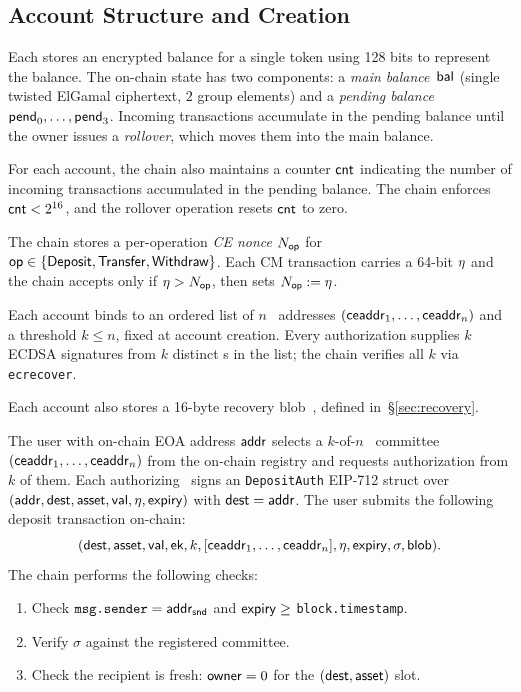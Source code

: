 \subsection{Account Structure and Creation}
\label{sec:account}

Each \CMAccount stores an encrypted balance for a single token using 128 bits to represent the balance.
The on-chain state has two components: a \emph{main balance}~$\mathsf{bal}$ (single twisted ElGamal ciphertext, $2$ group elements) and a \emph{pending balance}~$\mathsf{pend}_0, \ldots, \mathsf{pend}_3$.
Incoming transactions accumulate in the pending balance until the owner issues a \emph{rollover}, which moves them into the main balance.

For each account, the chain also maintains a counter $\mathsf{cnt}$ indicating the number of incoming transactions accumulated in the pending balance.
The chain enforces $\mathsf{cnt} < 2^{16}$, and the rollover operation resets $\mathsf{cnt}$ to zero.

The chain stores a per-operation \emph{CE nonce} $N_{\sf op}$ for ${\sf op} \in \{\mathsf{Deposit}, \mathsf{Transfer}, \mathsf{Withdraw}\}$.
Each CM transaction carries a 64-bit $\eta$ and the chain accepts only if $\eta > N_{\sf op}$, then sets $N_{\sf op} := \eta$.

Each account binds to an ordered list of $n$ \CE\ addresses $(\mathsf{ceaddr}_1, \ldots, \mathsf{ceaddr}_n)$ and a threshold $k \le n$, fixed at account creation.
Every authorization supplies $k$ ECDSA signatures from $k$ distinct \CE s in the list; the chain verifies all $k$ via \texttt{ecrecover}.

Each account also stores a 16-byte recovery blob~\blob, defined in~\S\ref{sec:recovery}.



The user with on-chain EOA address ${\mathsf{addr}}$ selects a $k$-of-$n$ \CE\ committee $(\mathsf{ceaddr}_1, \ldots, \mathsf{ceaddr}_n)$ from the on-chain registry and requests authorization from $k$ of them.
Each authorizing \CE\ signs an \texttt{DepositAuth} EIP-712 struct over $({\mathsf{addr}}, \mathsf{dest}, \mathsf{asset}, \mathsf{val}, \eta, \mathsf{expiry})$ with $\mathsf{dest} = {\mathsf{addr}}$.
The user submits the following deposit transaction on-chain:
%
\[
  (\mathsf{dest}, \mathsf{asset}, \mathsf{val}, \textsf{ek}, k, [\mathsf{ceaddr}_1, \ldots, \mathsf{ceaddr}_n], \eta, \mathsf{expiry}, \sigma, \mathsf{blob}).
\]
The chain performs the following checks:
%
\begin{enumerate}[nosep]
    \item Check $\texttt{msg.sender} = {\mathsf{addr}}_{\sf snd}$ and $\mathsf{expiry} \ge $ \texttt{block.timestamp}.
    \item Verify $\sigma$ against the registered committee.
    \item Check the recipient is fresh: $\mathsf{owner} = 0$ for the $(\mathsf{dest}, \mathsf{asset})$ slot.
\end{enumerate}



